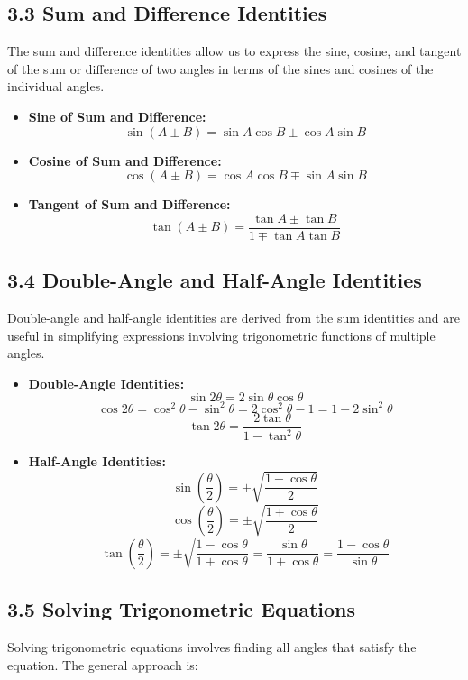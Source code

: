 \documentclass[12pt]{article}
\begin{document}
\subsection*{3.3 Sum and Difference Identities}
The sum and difference identities allow us to express the sine, cosine, and tangent of the sum or difference of two angles in terms of the sines and cosines of the individual angles.

\begin{itemize}
    \item \textbf{Sine of Sum and Difference:}
    \[
    \sin(A \pm B) = \sin A \cos B \pm \cos A \sin B
    \]
    
    \item \textbf{Cosine of Sum and Difference:}
    \[
    \cos(A \pm B) = \cos A \cos B \mp \sin A \sin B
    \]
    
    \item \textbf{Tangent of Sum and Difference:}
    \[
    \tan(A \pm B) = \frac{\tan A \pm \tan B}{1 \mp \tan A \tan B}
    \]
\end{itemize}

\subsection*{3.4 Double-Angle and Half-Angle Identities}
Double-angle and half-angle identities are derived from the sum identities and are useful in simplifying expressions involving trigonometric functions of multiple angles.

\begin{itemize}
    \item \textbf{Double-Angle Identities:}
    \[
    \sin 2\theta = 2 \sin\theta \cos\theta
    \]
    \[
    \cos 2\theta = \cos^2\theta - \sin^2\theta = 2\cos^2\theta - 1 = 1 - 2\sin^2\theta
    \]
    \[
    \tan 2\theta = \frac{2\tan\theta}{1 - \tan^2\theta}
    \]
    
    \item \textbf{Half-Angle Identities:}
    \[
    \sin\left(\frac{\theta}{2}\right) = \pm \sqrt{\frac{1 - \cos\theta}{2}}
    \]
    \[
    \cos\left(\frac{\theta}{2}\right) = \pm \sqrt{\frac{1 + \cos\theta}{2}}
    \]
    \[
    \tan\left(\frac{\theta}{2}\right) = \pm \sqrt{\frac{1 - \cos\theta}{1 + \cos\theta}} = \frac{\sin\theta}{1 + \cos\theta} = \frac{1 - \cos\theta}{\sin\theta}
    \]
\end{itemize}

\subsection*{3.5 Solving Trigonometric Equations}
Solving trigonometric equations involves finding all angles that satisfy the equation. The general approach is:
\end{document}
